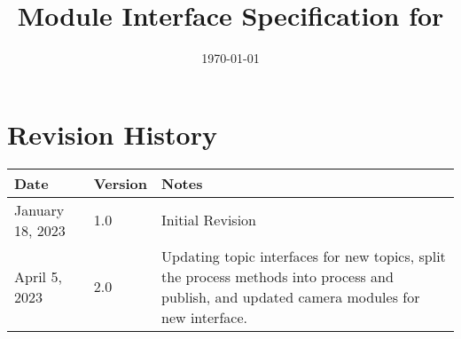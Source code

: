 \documentclass[12pt, titlepage]{article}
\begin{document}
\title{Module Interface Specification for \progname{}}

\author{\authname}

\date{\today}

\maketitle


\section{Revision History}

\begin{tabularx}{\textwidth}{p{3cm}p{2cm}X}
\toprule {\bf Date} & {\bf Version} & {\bf Notes}\\
\midrule
January 18, 2023 & 1.0 & Initial Revision\\
April 5, 2023 & 2.0 & Updating topic interfaces for new topics, split the process methods into process and publish, and updated camera modules for new interface. \\
\bottomrule
\end{tabularx}

~\newpage
\end{document}
